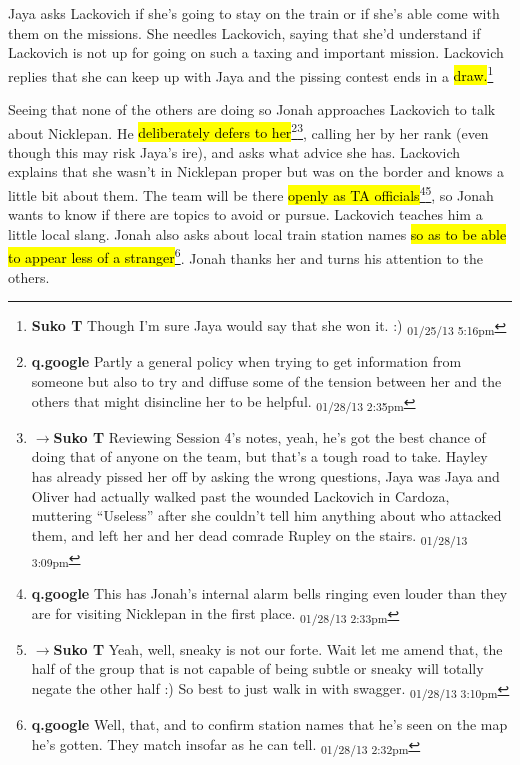 Jaya asks Lackovich if she's going to stay on the train or if she's able come with them on the missions.  She needles Lackovich, saying that she'd understand if Lackovich is not up for going on such a taxing and important mission.  Lackovich replies that she can keep up with Jaya and the pissing contest ends in a \hl{draw.}\footnote{\textbf{Suko T }Though I'm sure Jaya would say that she won it. :) \textsubscript{01/25/13 5:16pm}}



Seeing that none of the others are doing so Jonah approaches Lackovich to talk about Nicklepan.  He \hl{deliberately defers to her}\footnote{\textbf{q.google }Partly a general policy when trying to get information from someone but also to try and diffuse some of the tension between her and the others that might disincline her to be helpful. \textsubscript{01/28/13 2:35pm}}\footnote{$\rightarrow$\textbf{Suko T }Reviewing Session 4's notes, yeah, he's got the best chance of doing that of anyone on the team, but that's a tough road to take.  Hayley has already pissed her off by asking the wrong questions, Jaya was Jaya and Oliver had actually walked past the wounded Lackovich in Cardoza, muttering ``Useless'' after she couldn't tell him anything about who attacked them, and left her and her dead comrade Rupley on the stairs. \textsubscript{01/28/13 3:09pm}}, calling her by her rank (even though this may risk Jaya's ire), and asks what advice she has.  Lackovich explains that she wasn't in Nicklepan proper but was on the border and knows a little bit about them.  The team will be there \hl{openly as TA officials}\footnote{\textbf{q.google }This has Jonah's internal alarm bells ringing even louder than they are for visiting Nicklepan in the first place. \textsubscript{01/28/13 2:33pm}}\footnote{$\rightarrow$\textbf{Suko T }Yeah, well, sneaky is not our forte.  Wait let me amend that, the half of the group that is not capable of being subtle or sneaky will totally negate the other half :)  So best to just walk in with swagger. \textsubscript{01/28/13 3:10pm}}, so Jonah wants to know if there are topics to avoid or pursue.  Lackovich teaches him a little local slang.  Jonah also asks about local train station names \hl{so as to be able to appear less of a stranger}\footnote{\textbf{q.google }Well, that, and to confirm station names that he's seen on the map he's gotten.  They match insofar as he can tell. \textsubscript{01/28/13 2:32pm}}.  Jonah thanks her and turns his attention to the others.



